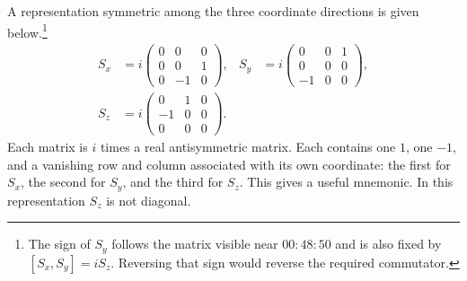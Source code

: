 A representation symmetric among the three coordinate directions is given below.\footnote{The sign of \(S_y\) follows the matrix visible near \(00{:}48{:}50\) and is also fixed by \([S_x,S_y]=iS_z\). Reversing that sign would reverse the required commutator.}
\begin{equation}
\begin{aligned}
S_x
&=
i
\begin{pmatrix}
0&0&0\\
0&0&1\\
0&-1&0
\end{pmatrix},
&
S_y
&=
i
\begin{pmatrix}
0&0&1\\
0&0&0\\
-1&0&0
\end{pmatrix},\\
S_z
&=
i
\begin{pmatrix}
0&1&0\\
-1&0&0\\
0&0&0
\end{pmatrix}.
\end{aligned}
\end{equation}
Each matrix is \(i\) times a real antisymmetric matrix. Each contains one \(1\), one \(-1\), and a vanishing row and column associated with its own coordinate: the first for \(S_x\), the second for \(S_y\), and the third for \(S_z\). This gives a useful mnemonic. In this representation \(S_z\) is not diagonal.

